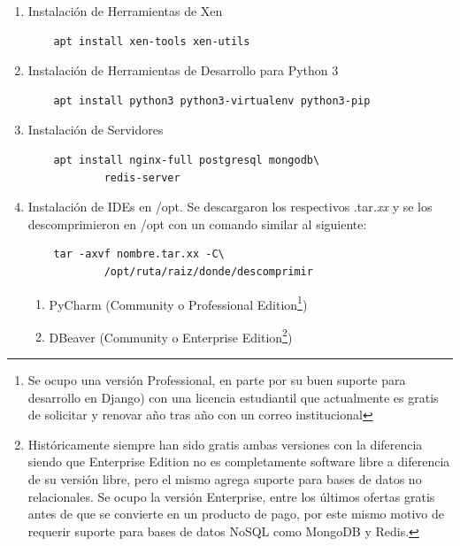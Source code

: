 \begin{enumerate}
\begin{lstlisting}
	auto xenbr0
	iface xenbr0 inet static
		address 10.10.10.1
		netmask 255.255.255.0
		bridge_ports wlan0

	#other possibly useful options in a
	#	virtualized environment
		#bridge_stp off		# disable
		#		Spanning Tree Protocol
		#bridge_waitport 0	# no delay
		#		before a port becomes
		#		available
		#bridge_fd 0		# no forwarding
		#		delay

	## configure a (separate) bridge for
	#	the DomUs without giving Dom0 an
	#	IP on it
	#auto xenbr1
	#iface xenbr1 inet manual
	#   bridge_ports eth1

	EOF

	reboot
		\end{lstlisting}
	\item Instalación de Herramientas de Xen
		\begin{lstlisting}
	apt install xen-tools xen-utils
		\end{lstlisting}
    \item Instalación de Herramientas de Desarrollo para Python 3
    	\begin{lstlisting}
	apt install python3 python3-virtualenv python3-pip
    	\end{lstlisting}
    \item Instalación de Servidores
    	\begin{lstlisting}
	apt install nginx-full postgresql mongodb\
    		redis-server
    	\end{lstlisting}
    \item Instalación de IDEs en /opt. Se descargaron los respectivos .tar\textit{.xx} y se los descomprimieron en /opt con un comando similar al siguiente:
    	\begin{lstlisting}
	tar -axvf nombre.tar.xx -C\
    		/opt/ruta/raiz/donde/descomprimir
    	\end{lstlisting}
    \begin{enumerate}
    	\item PyCharm (Community o Professional Edition\footnote{Se ocupo una versión Professional, en parte por su buen suporte para desarrollo en Django) con una licencia estudiantil que actualmente es gratis de solicitar y renovar año tras año con un correo institucional})
        \item DBeaver (Community o Enterprise Edition\footnote{Históricamente siempre han sido gratis ambas versiones con la diferencia siendo que Enterprise Edition no es completamente software libre a diferencia de su versión libre, pero el mismo agrega suporte para bases de datos no relacionales. Se ocupo la versión Enterprise, entre los últimos ofertas gratis antes de que se convierte en un producto de pago, por este mismo motivo de requerir suporte para bases de datos NoSQL como MongoDB y Redis.})
    \end{enumerate}
\end{enumerate}

